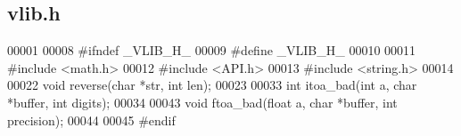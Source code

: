 \subsection{vlib.\+h}
\label{vlib_8h_source}

\begin{DoxyCode}
00001 
00008 \textcolor{preprocessor}{#ifndef \_VLIB\_H\_}
00009 \textcolor{preprocessor}{#define \_VLIB\_H\_}
00010 
00011 \textcolor{preprocessor}{#include <math.h>}
00012 \textcolor{preprocessor}{#include <API.h>}
00013 \textcolor{preprocessor}{#include <string.h>}
00014 
00022 \textcolor{keywordtype}{void} reverse(\textcolor{keywordtype}{char} *str, \textcolor{keywordtype}{int} len);
00023 
00033 \textcolor{keywordtype}{int} itoa_bad(\textcolor{keywordtype}{int} a, \textcolor{keywordtype}{char} *buffer, \textcolor{keywordtype}{int} digits);
00034 
00043 \textcolor{keywordtype}{void} ftoa_bad(\textcolor{keywordtype}{float} a, \textcolor{keywordtype}{char} *buffer, \textcolor{keywordtype}{int} precision);
00044 
00045 \textcolor{preprocessor}{#endif}
\end{DoxyCode}
